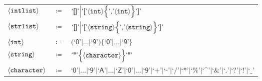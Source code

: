 \documentclass{standalone}
\begin{document}
\begin{tabular}{lll}
$\langle\texttt{intlist}\rangle$      & $\coloneqq$ & $\textsf{`[]'}\Big|\textsf{`['} \langle\texttt{int}\rangle
                                 \Big\{\textsf{`,'} \langle\texttt{int}\rangle
                                 \Big\} \textsf{`]'}$                         \\
$\langle\texttt{strlist}\rangle$      & $\coloneqq$ & $\textsf{`[]'}\Big|\textsf{`['} \langle\texttt{string}\rangle
                                 \Big\{\textsf{`,'} \langle\texttt{string}\rangle
                                 \Big\} \textsf{`]'}$                         \\
$\langle\texttt{int}\rangle$      	& $\coloneqq$ & $\Big( \textsf{`0'} \Big| \dots \Big|
                                 \textsf{`9'} \Big)
                                 \Big\{
                                 \textsf{`0'} \Big| \dots \Big| \textsf{`9'}
                                 \Big\}$                                      \\
$\langle\texttt{string}\rangle$         & $\coloneqq$ & $\textsf{`"'} \Big\{ \langle\texttt{character}\rangle \Big\}
                                 \textsf{`"'}$                                \\
$\langle\texttt{character}\rangle$	& $\coloneqq$ & $\textsf{`0'} \Big| \dots \Big| \textsf{`9'}
                                 \Big| \textsf{`A'} \Big| \dots \Big|
                                 \textsf{`Z'} \Big| \textsf{`0'} \Big| \dots
                                 \Big| \textsf{`9'} \Big| \textsf{`+'} \Big|
                                 \textsf{`-'} \Big| \textsf{`/'}
                                 \Big| \textsf{`*'} \Big|\textsf{`\%'} \Big|
                                 \textsf{`\textasciicircum'} \Big| \textsf{`\&'}
                                 \Big| \textsf{`.'} \Big|\textsf{`?'} \Big|
                                 \textsf{`!'} \Big| \textsf{`\_'}$
\end{tabular}
\end{document}
